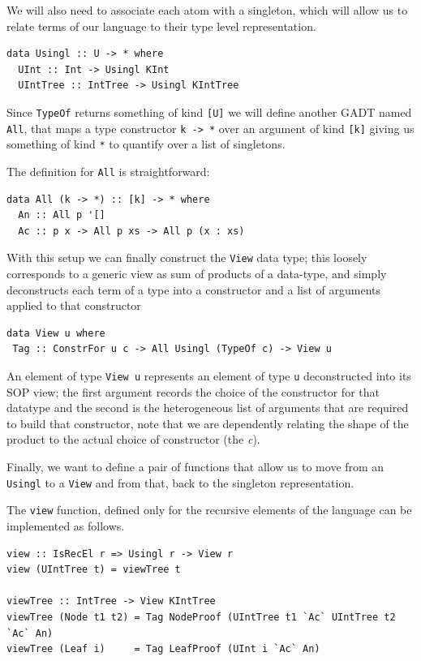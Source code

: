 \documentclass[11pt, titlepage]{article}
\newcommand{\toHaskell}[1]{\texttt{#1}\xspace}
\begin{document}
We will also need to associate each atom with a singleton, which will
allow us to relate terms of our language to their type level representation. 

\begin{verbatim}
data Usingl :: U -> * where
  UInt :: Int -> Usingl KInt
  UIntTree :: IntTree -> Usingl KIntTree
\end{verbatim}

Since \toHaskell{TypeOf} returns something of kind \toHaskell{[U]} we will define another GADT named \toHaskell{All}, that maps a type constructor \toHaskell{k -> *} over an argument of kind \texttt{[k]} giving us something of kind \texttt{*} to quantify over a list of singletons.

The definition for \texttt{All} is straightforward:

\begin{verbatim}
data All (k -> *) :: [k] -> * where
  An :: All p '[]
  Ac :: p x -> All p xs -> All p (x : xs)
\end{verbatim}


With this setup we can finally construct the \texttt{View} data type; this loosely corresponds to a generic view as sum of products of a data-type, and simply deconstructs each term of a type into a constructor and a list of arguments applied to that constructor

\begin{verbatim}
data View u where
 Tag :: ConstrFor u c -> All Usingl (TypeOf c) -> View u
\end{verbatim}

An element of type \texttt{View u} represents an element of type \texttt{u}  deconstructed into its SOP view; the first argument records the choice 
of the constructor for that datatype and the second is the heterogeneous list of 
arguments that are required to build that constructor, note that we are 
dependently relating the shape of the product to the actual choice of 
constructor (the \emph{c}).

Finally, we want to define a pair of functions that allow us to move from an \toHaskell{Usingl} to a \toHaskell{View} and from that, back to the singleton representation.

The \toHaskell{view} function, defined only for the recursive elements of the language can be implemented as follows.

\begin{verbatim}
view :: IsRecEl r => Usingl r -> View r
view (UIntTree t) = viewTree t

viewTree :: IntTree -> View KIntTree
viewTree (Node t1 t2) = Tag NodeProof (UIntTree t1 `Ac` UIntTree t2 `Ac` An)
viewTree (Leaf i)     = Tag LeafProof (UInt i `Ac` An)
\end{verbatim}
\end{document}
